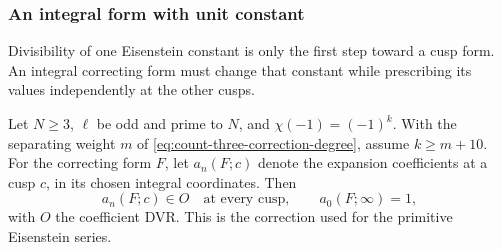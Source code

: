 \subsubsection{An integral form with unit constant}
\label{par:count-three-cusp-correction}

Divisibility of one Eisenstein constant is only the first step toward a cusp form. An integral correcting form must change that constant while prescribing its values independently at the other cusps.

\begin{proposition}\label{prop:unit-constant-cusp-correction}
Let \(N\ge3\), \(\ell\) be odd and prime to \(N\), and
\(\chi(-1)=(-1)^k\). With the separating weight \(m\) of
\eqref{eq:count-three-correction-degree}, assume \(k\ge m+10\).
For the correcting form \(F\), let \(a_n(F;c)\) denote the expansion coefficients at a cusp \(c\), in its chosen integral coordinates. Then 
\[
 a_n(F;c)\in O\quad\text{at every cusp},\qquad a_0(F;\infty)=1,
\]
 with \(O\) the coefficient DVR. This is
the correction used for the primitive Eisenstein series.
\end{proposition}

